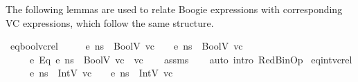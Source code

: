 \begin{isabellebody}
\isadelimdocument
%
\endisadelimdocument
%
\begin{isamarkuptext}%
The following lemmas are used to relate Boogie expressions with corresponding VC expressions,
which follow the same structure.%
\end{isamarkuptext}\isamarkuptrue%
\isamarkupfalse%
\ eq{\isacharunderscore}{\kern0pt}bool{\isacharunderscore}{\kern0pt}vc{\isacharunderscore}{\kern0pt}rel{\isacharcolon}{\kern0pt}\isanewline
\ \ \ {\isachardoublequoteopen}{\isasymLambda}{\isacharcomma}{\kern0pt}{\isasymGamma}{\isacharcomma}{\kern0pt}{\isasymOmega}\ {\isasymturnstile}\ {\isasymlangle}e{}{\isacharcomma}{\kern0pt}\ ns{\isasymrangle}\ {\isasymDown}\ BoolV\ vc{}{\isachardoublequoteclose}\ \ {\isachardoublequoteopen}{\isasymLambda}{\isacharcomma}{\kern0pt}{\isasymGamma}{\isacharcomma}{\kern0pt}{\isasymOmega}\ {\isasymturnstile}\ {\isasymlangle}e{}{\isacharcomma}{\kern0pt}\ ns{\isasymrangle}\ {\isasymDown}\ BoolV\ vc{}{\isachardoublequoteclose}\isanewline
\ \ \ {\isachardoublequoteopen}{\isasymLambda}{\isacharcomma}{\kern0pt}{\isasymGamma}{\isacharcomma}{\kern0pt}{\isasymOmega}\ {\isasymturnstile}\ {\isasymlangle}e{}\ {\isasymguillemotleft}Eq{\isasymguillemotright}\ e{}{\isacharcomma}{\kern0pt}\ ns{\isasymrangle}\ {\isasymDown}\ BoolV\ {\isacharparenleft}{\kern0pt}vc{}\ {\isacharequal}{\kern0pt}\ vc{}{\isacharparenright}{\kern0pt}{\isachardoublequoteclose}\isanewline
%
\isadelimproof
\ \ %
\endisadelimproof
%
\isatagproof
{}\isamarkupfalse%
\ assms\isanewline
\ \ \isamarkupfalse%
\ {\isacharparenleft}{\kern0pt}auto\ intro{\isacharcolon}{\kern0pt}\ RedBinOp{\isacharparenright}{\kern0pt}%
\endisatagproof
{\isafoldproof}%
%
\isadelimproof
\isanewline
%
\endisadelimproof
\isanewline
{}\isamarkupfalse%
\ eq{\isacharunderscore}{\kern0pt}int{\isacharunderscore}{\kern0pt}vc{\isacharunderscore}{\kern0pt}rel{\isacharcolon}{\kern0pt}\isanewline
\ \ \ {\isachardoublequoteopen}{\isasymLambda}{\isacharcomma}{\kern0pt}{\isasymGamma}{\isacharcomma}{\kern0pt}{\isasymOmega}\ {\isasymturnstile}\ {\isasymlangle}e{}{\isacharcomma}{\kern0pt}\ ns{\isasymrangle}\ {\isasymDown}\ IntV\ vc{}{\isachardoublequoteclose}\ \ {\isachardoublequoteopen}{\isasymLambda}{\isacharcomma}{\kern0pt}{\isasymGamma}{\isacharcomma}{\kern0pt}{\isasymOmega}\ {\isasymturnstile}\ {\isasymlangle}e{}{\isacharcomma}{\kern0pt}\ ns{\isasymrangle}\ {\isasymDown}\ IntV\ vc{}{\isachardoublequoteclose}\isanewline

\end{isabellebody}
